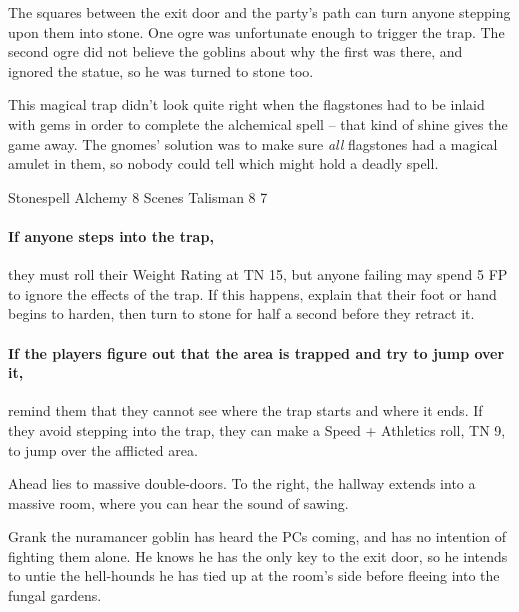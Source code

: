 \begin{multicols}{2}
\begin{boxtext}
\end{boxtext}

The squares between the exit door and the party's path can turn anyone stepping upon them into stone.
One ogre was unfortunate enough to trigger the trap.
The second ogre did not believe the goblins about why the first was there, and ignored the statue, so he was turned to stone too.

This magical trap didn't look quite right when the flagstones had to be inlaid with gems in order to complete the alchemical spell -- that kind of shine gives the game away.
The gnomes' solution was to make sure \textit{all} flagstones had a magical amulet in them, so nobody could tell which might hold a deadly spell.

	{Stonespell}%
	{Alchemy}%
	{8 Scenes}%
	{Talisman}%
	{8}%
	{7}%

\paragraph{If anyone steps into the trap,}
they must roll their Weight Rating at TN 15, but anyone failing may spend 5 FP to ignore the effects of the trap.
If this happens, explain that their foot or hand begins to harden, then turn to stone for half a second before they retract it.

\paragraph{If the players figure out that the area is trapped and try to jump over it,}
remind them that they cannot see where the trap starts and where it ends.
If they avoid stepping into the trap, they can make a Speed + Athletics roll, TN 9, to jump over the afflicted area.


\begin{boxtext}

	Ahead lies to massive double-doors.
	To the right, the hallway extends into a massive room, where you can hear the sound of sawing.

\end{boxtext}

Grank the nuramancer goblin has heard the PCs coming, and has no intention of fighting them alone.
He knows he has the only key to the exit door, so he intends to untie the hell-hounds he has tied up at the room's side before fleeing into the fungal gardens.


\end{multicols}
